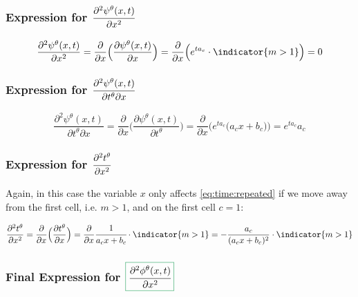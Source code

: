\subsubsection{Expression for $\cfrac{\partial^2 \psi^\theta(x,t)}{\partial x^2}$}

\begin{equation}
\frac{\partial^2 \psi^\theta(x,t)}{\partial x^2} = 
\frac{\partial}{\partial x}\Big(\frac{\partial \psi^\theta(x,t)}{\partial x}\Big) = 
\frac{\partial}{\partial x}\Big(e^{t a_c}\cdot \indicator{m>1}\Big) = 0
\end{equation}

\subsubsection{Expression for $\cfrac{\partial^2 \psi^\theta(x,t)}{\partial t^\theta \partial x}$}

\begin{equation}
  \frac{\partial^2 \psi^\theta(x,t)}{\partial t^\theta \partial x} = 
  \frac{\partial}{\partial x}\Big(\frac{\partial \psi^\theta(x,t)}{\partial t^\theta}\Big) = 
  \frac{\partial}{\partial x}\Big(e^{t a_c} \big( a_c x + b_c \big)\Big) = e^{t a_c} a_c
\end{equation}

\subsubsection{Expression for $\cfrac{\partial^2 t^\theta}{\partial x^2}$}

Again, in this case the variable $x$ only affects \cref{eq:time:repeated} if we move away from the first cell, i.e. $m>1$, and on the first cell $c=1$:

\begin{equation}
  \frac{\partial^2 t^\theta}{\partial x^2} = 
  \frac{\partial}{\partial x}\Big(\frac{\partial  t^\theta}{\partial x}\Big) = 
  \frac{\partial}{\partial x} \cfrac{1}{a_c x + b_c} \cdot \indicator{m>1} = %
  - \frac{a_{c}}{(a_{c} x + b_{c})^2} \cdot \indicator{m>1} %
\end{equation}

\subsubsection{Final Expression for $\color{ForestGreen}\boxed{\color{black}\cfrac{\partial^2 \phi^\theta(x,t)}{\partial x^2}}$}

